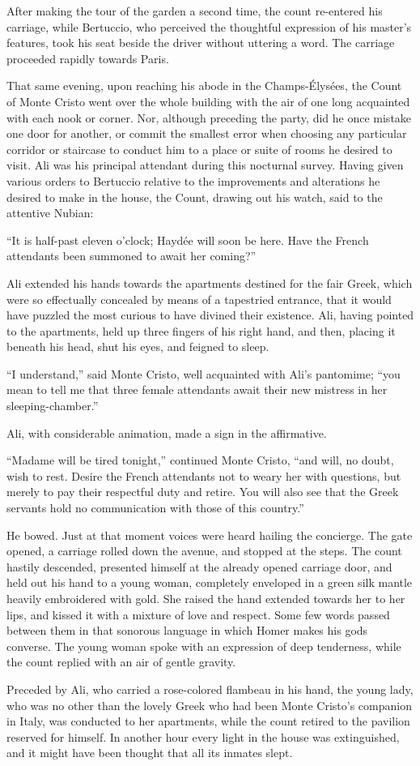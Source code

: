 After making the tour of the garden a second time, the count re-entered
his carriage, while Bertuccio, who perceived the thoughtful expression
of his master’s features, took his seat beside the driver without
uttering a word. The carriage proceeded rapidly towards Paris.

That same evening, upon reaching his abode in the Champs-Élysées, the
Count of Monte Cristo went over the whole building with the air of one
long acquainted with each nook or corner. Nor, although preceding the
party, did he once mistake one door for another, or commit the smallest
error when choosing any particular corridor or staircase to conduct him
to a place or suite of rooms he desired to visit. Ali was his principal
attendant during this nocturnal survey. Having given various orders to
Bertuccio relative to the improvements and alterations he desired to
make in the house, the Count, drawing out his watch, said to the
attentive Nubian:

“It is half-past eleven o’clock; Haydée will soon be here. Have the
French attendants been summoned to await her coming?”

Ali extended his hands towards the apartments destined for the fair
Greek, which were so effectually concealed by means of a tapestried
entrance, that it would have puzzled the most curious to have divined
their existence. Ali, having pointed to the apartments, held up three
fingers of his right hand, and then, placing it beneath his head, shut
his eyes, and feigned to sleep.

“I understand,” said Monte Cristo, well acquainted with Ali’s
pantomime; “you mean to tell me that three female attendants await
their new mistress in her sleeping-chamber.”

Ali, with considerable animation, made a sign in the affirmative.

“Madame will be tired tonight,” continued Monte Cristo, “and will, no
doubt, wish to rest. Desire the French attendants not to weary her with
questions, but merely to pay their respectful duty and retire. You will
also see that the Greek servants hold no communication with those of
this country.”

He bowed. Just at that moment voices were heard hailing the concierge.
The gate opened, a carriage rolled down the avenue, and stopped at the
steps. The count hastily descended, presented himself at the already
opened carriage door, and held out his hand to a young woman,
completely enveloped in a green silk mantle heavily embroidered with
gold. She raised the hand extended towards her to her lips, and kissed
it with a mixture of love and respect. Some few words passed between
them in that sonorous language in which Homer makes his gods converse.
The young woman spoke with an expression of deep tenderness, while the
count replied with an air of gentle gravity.

Preceded by Ali, who carried a rose-colored flambeau in his hand, the
young lady, who was no other than the lovely Greek who had been Monte
Cristo’s companion in Italy, was conducted to her apartments, while the
count retired to the pavilion reserved for himself. In another hour
every light in the house was extinguished, and it might have been
thought that all its inmates slept.
